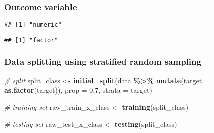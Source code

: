\documentclass[
]{book}
\newenvironment{Shaded}{\begin{snugshade}}{\end{snugshade}}
\newcommand{\CommentTok}[1]{\textcolor[rgb]{0.56,0.35,0.01}{\textit{#1}}}
\newcommand{\DataTypeTok}[1]{\textcolor[rgb]{0.13,0.29,0.53}{#1}}
\newcommand{\FloatTok}[1]{\textcolor[rgb]{0.00,0.00,0.81}{#1}}
\newcommand{\KeywordTok}[1]{\textcolor[rgb]{0.13,0.29,0.53}{\textbf{#1}}}
\newcommand{\NormalTok}[1]{#1}
\newcommand{\OperatorTok}[1]{\textcolor[rgb]{0.81,0.36,0.00}{\textbf{#1}}}
\newcommand{\StringTok}[1]{\textcolor[rgb]{0.31,0.60,0.02}{#1}}
\begin{document}
\hypertarget{outcome-variable-1}{%
\subsubsection{Outcome variable}\label{outcome-variable-1}}

\begin{Shaded}
\end{Shaded}

\begin{verbatim}
## [1] "numeric"
\end{verbatim}

\begin{Shaded}
\end{Shaded}

\begin{verbatim}
## [1] "factor"
\end{verbatim}

\hypertarget{data-splitting-using-stratified-random-sampling}{%
\subsubsection{Data splitting using stratified random sampling}\label{data-splitting-using-stratified-random-sampling}}

\begin{Shaded}
\begin{Highlighting}[]
\CommentTok{\# split }
\NormalTok{split\_class \textless{}{-}}\StringTok{ }\KeywordTok{initial\_split}\NormalTok{(data }\OperatorTok{\%\textgreater{}\%}
\StringTok{                             }\KeywordTok{mutate}\NormalTok{(}\DataTypeTok{target =} \KeywordTok{as.factor}\NormalTok{(target)), }
                             \DataTypeTok{prop =} \FloatTok{0.7}\NormalTok{, }
                             \DataTypeTok{strata =}\NormalTok{ target)}

\CommentTok{\# training set }
\NormalTok{raw\_train\_x\_class \textless{}{-}}\StringTok{ }\KeywordTok{training}\NormalTok{(split\_class)}

\CommentTok{\# testing set }
\NormalTok{raw\_test\_x\_class \textless{}{-}}\StringTok{ }\KeywordTok{testing}\NormalTok{(split\_class)}
\end{Highlighting}
\end{Shaded}
\end{document}
